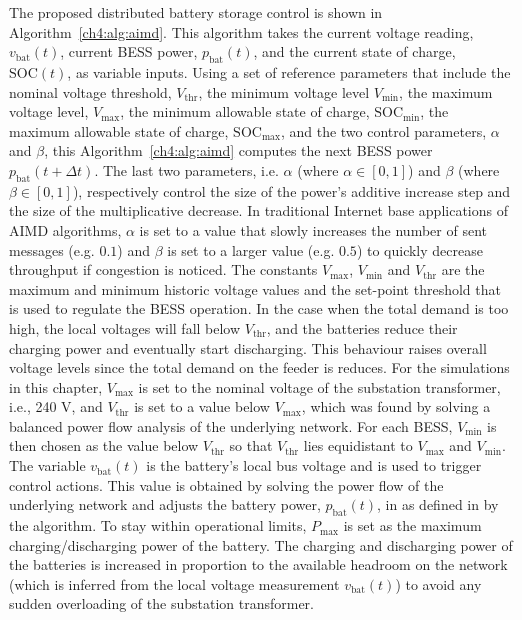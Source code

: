 The proposed distributed battery storage control is shown in Algorithm~\ref{ch4:alg:aimd}.
This algorithm takes the current voltage reading, $v_\text{bat}(t)$, current BESS power, $p_\text{bat}(t)$, and the current state of charge, $\text{SOC}(t)$, as variable inputs.
Using a set of reference parameters that include the nominal voltage threshold, $V_\text{thr}$, the minimum voltage level $V_\text{min}$, the maximum voltage level, $V_\text{max}$, the minimum allowable state of charge, $\text{SOC}_\text{min}$, the maximum allowable state of charge, $\text{SOC}_\text{max}$, and the two control parameters, $\alpha$ and $\beta$, this Algorithm~\ref{ch4:alg:aimd} computes the next BESS power $p_\text{bat}(t + \Delta t)$.
The last two parameters, i.e. $\alpha$ (where $\alpha \in [0, 1]$) and $\beta$ (where $\beta \in [0, 1]$), respectively control the size of the power's additive increase step and the size of the multiplicative decrease.
In traditional Internet base applications of AIMD algorithms, $\alpha$ is set to a value that slowly increases the number of sent messages (e.g. $0.1$) and $\beta$ is set to a larger value (e.g. $0.5$) to quickly decrease throughput if congestion is noticed.
The constants $V_\text{max}$, $V_\text{min}$ and $V_\text{thr}$ are the maximum and minimum historic voltage values and the set-point threshold that is used to regulate the BESS operation.
In the case when the total demand is too high, the local voltages will fall below $V_\text{thr}$, and the batteries reduce their charging power and eventually start discharging.
This behaviour raises overall voltage levels since the total demand on the feeder is reduces.
For the simulations in this chapter, $V_\text{max}$ is set to the nominal voltage of the substation transformer, i.e., 240 V, and $V_\text{thr}$ is set to a value below $V_\text{max}$, which was found by solving a balanced power flow analysis of the underlying network.
For each BESS, $V_\text{min}$ is then chosen as the value below $V_\text{thr}$ so that $V_\text{thr}$ lies equidistant to $V_\text{max}$ and $V_\text{min}$.
The variable $v_\text{bat}(t)$ is the battery's local bus voltage and is used to trigger control actions.
This value is obtained by solving the power flow of the underlying network and adjusts the battery power, $p_\text{bat}(t)$, in as defined in by the algorithm.
To stay within operational limits, $P_\text{max}$ is set as the maximum charging/discharging power of the battery.
The charging and discharging power of the batteries is increased in proportion to the available headroom on the network (which is inferred from the local voltage measurement $v_\text{bat}(t)$) to avoid any sudden overloading of the substation transformer.

